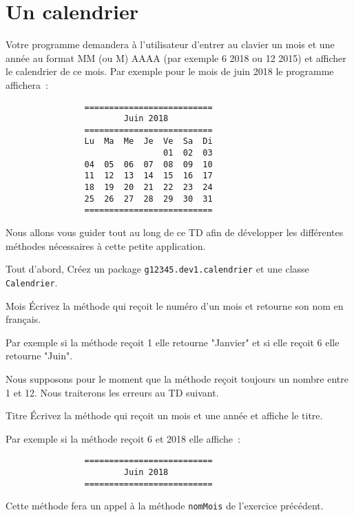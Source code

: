 \documentclass[a4paper,11pt]{style-esi/td}
\begin{document}

\section{Un calendrier}

Votre programme demandera à l'utilisateur d'entrer au clavier un mois et une année 
au format MM (ou M) AAAA (par exemple 6 2018 ou 12 2015) et afficher le calendrier de ce mois.
Par exemple pour le mois de juin 2018 le programme affichera~: 

\begin{verbatim}
                ==========================
                        Juin 2018
                ========================== 
                Lu  Ma  Me  Je  Ve  Sa  Di
                                01  02  03   
                04  05  06  07  08  09  10   
                11  12  13  14  15  16  17   
                18  19  20  21  22  23  24   
                25  26  27  28  29  30  31      
                ==========================
\end{verbatim}

Nous allons vous guider tout au long de ce TD afin de développer les différentes méthodes nécessaires à cette petite application.

Tout d'abord,
Créez un package \texttt{g12345.dev1.calendrier} et une classe \texttt{Calendrier}.


 	\begin{Exercice}{Mois}
		\'Ecrivez la méthode  qui reçoit le numéro d'un mois et retourne son nom en français.
		
		Par exemple si la méthode reçoit 1 elle retourne "Janvier" et si elle reçoit 6 elle retourne "Juin".
		
		Nous supposons pour le moment que la méthode reçoit toujours un nombre entre 1 et 12.
		Nous traiterons les erreurs au TD suivant.
	\end{Exercice} 

 
 	\begin{Exercice}{Titre}
		\'Ecrivez la méthode  qui reçoit un mois et une année
		et affiche le titre. 
		
		Par exemple si la méthode reçoit 6 et 2018 elle affiche~:
		\begin{verbatim}
                ==========================
                        Juin 2018
                ========================== 
		\end{verbatim}	
		
		Cette méthode fera un appel à la méthode \texttt{nomMois} de l'exercice précédent.
	\end{Exercice} 
\end{document}
